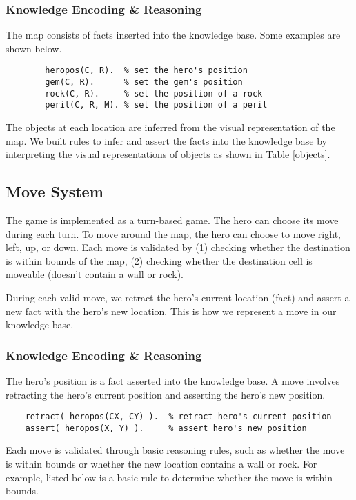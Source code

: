 \documentclass[10pt]{article}
\begin{document}
\subsubsection*{Knowledge Encoding \& Reasoning}

The map consists of facts inserted into the knowledge base. Some examples are shown below.

\begin{verbatim}
        heropos(C, R).  % set the hero's position
        gem(C, R).      % set the gem's position
        rock(C, R).     % set the position of a rock
        peril(C, R, M). % set the position of a peril
\end{verbatim}

The objects at each location are inferred from the visual representation of the map. We built rules to infer and assert the facts into the knowledge base by interpreting the visual representations of objects as shown in Table \ref{objects}.


\subsection{Move System}

The game is implemented as a turn-based game. The hero can choose its move during each turn. To move around the map, the hero can choose to move right, left, up, or down. Each move is validated by (1) checking whether the destination is within bounds of the map, (2) checking whether the destination cell is moveable (doesn’t contain a wall or rock).

During each valid move, we retract the hero’s current location (fact) and assert a new fact with the hero’s new location. This is how we represent a move in our knowledge base.

\subsubsection*{Knowledge Encoding \& Reasoning}

The hero’s position is a fact asserted into the knowledge base. A move involves retracting the hero's current position and asserting the hero's new position.

\begin{verbatim}
    retract( heropos(CX, CY) ).  % retract hero's current position
    assert( heropos(X, Y) ).     % assert hero's new position
\end{verbatim}

Each move is validated through basic reasoning rules, such as whether the move is within bounds or whether the new location contains a wall or rock. For example, listed below is a basic rule to determine whether the move is within bounds.
\end{document}
